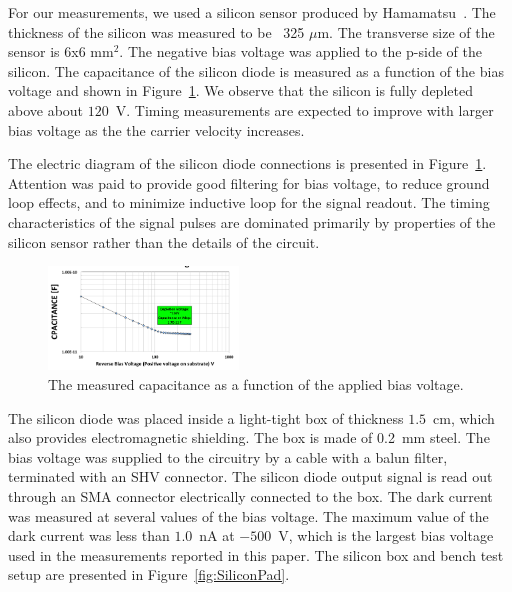 \documentclass[12pt]{article}
\begin{document}
{For our measurements, we used a silicon sensor produced by
Hamamatsu~\cite{hamamatsu}. The thickness of the silicon was measured to be ~325
$\mu$m. The transverse size of the sensor is 6x6 mm$^2$. The negative bias
voltage was applied to the p-side of the silicon. The capacitance
of the silicon diode is measured as a function of the bias voltage
and shown in Figure~\ref{fig:SiliconDiode}. We observe that the silicon
is fully depleted above about $120$~V. Timing measurements are expected
to improve with larger bias voltage as the the carrier velocity increases.

The electric diagram of the silicon
diode connections is presented in Figure~\ref{fig:SiliconDiode}. Attention was
paid to provide good filtering for bias voltage, to reduce ground loop effects, and
to minimize inductive loop for the signal readout. The timing characteristics
of the signal pulses are dominated primarily by properties of the
silicon sensor rather than the details of the circuit.

\begin{figure}[htbp] 
\centering
\includegraphics[width=0.45\textwidth]{plots/SiliconDiodeCV.png} 
\caption{The measured capacitance as a function of the applied bias voltage.} 
\label{fig:SiliconDiode} 
\end{figure} 

The silicon diode was placed inside a light-tight box of thickness $1.5$~cm,
which also provides electromagnetic shielding. The box is made of 0.2~mm steel.
The bias voltage was supplied to the circuitry by a cable with a balun filter,
terminated with an SHV connector. The silicon diode output signal is read out
through an SMA connector electrically connected to the box. The dark current was
measured at several values of the bias voltage. The maximum value of the dark
current was less than $1.0$~nA at $-500$~V, which is the largest bias voltage
used in the measurements reported in this paper. The silicon box and bench test
setup are presented in Figure~\ref{fig:SiliconPad}. 

}
\end{document}
